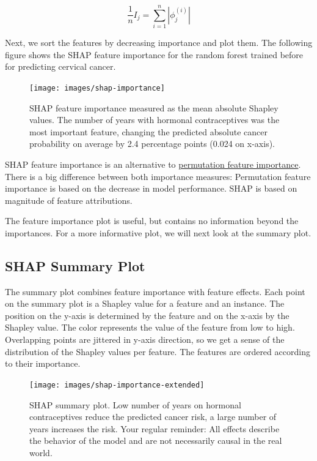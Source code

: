 \documentclass[
  11pt,
]{scrbook}
\begin{document}
\[\frac{1}{n}I_j=\sum_{i=1}^n{}|\phi_j^{(i)}|\]

Next, we sort the features by decreasing importance and plot them.
The following figure shows the SHAP feature importance for the random forest trained before for predicting cervical cancer.

\begin{figure}

{\centering \texttt{[image: images/shap-importance]} 

}

\caption{SHAP feature importance measured as the mean absolute Shapley values. The number of years with hormonal contraceptives was the most important feature, changing the predicted absolute cancer probability on average by 2.4 percentage points (0.024 on x-axis).}\label{fig:unnamed-chunk-45}
\end{figure}

SHAP feature importance is an alternative to \protect\hyperlink{feature-importance}{permutation feature importance}.
There is a big difference between both importance measures:
Permutation feature importance is based on the decrease in model performance.
SHAP is based on magnitude of feature attributions.

The feature importance plot is useful, but contains no information beyond the importances.
For a more informative plot, we will next look at the summary plot.

\hypertarget{shap-summary-plot}{%
\subsection{SHAP Summary Plot}\label{shap-summary-plot}}

The summary plot combines feature importance with feature effects.
Each point on the summary plot is a Shapley value for a feature and an instance.
The position on the y-axis is determined by the feature and on the x-axis by the Shapley value.
The color represents the value of the feature from low to high.
Overlapping points are jittered in y-axis direction, so we get a sense of the distribution of the Shapley values per feature.
The features are ordered according to their importance.

\begin{figure}

{\centering \texttt{[image: images/shap-importance-extended]} 

}

\caption{SHAP summary plot. Low number of years on hormonal contraceptives reduce the predicted cancer risk, a large number of years increases the risk. Your regular reminder: All effects describe the behavior of the model and are not necessarily causal in the real world.}\label{fig:unnamed-chunk-46}
\end{figure}
\end{document}
